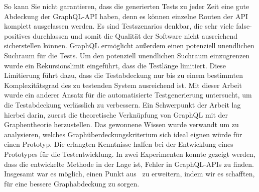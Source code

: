 So kann Sie nicht garantieren, dass die generierten Tests zu jeder Zeit eine gute Abdeckung der GraphQL-API haben, denn es können einzelne Routen der API
komplett ausgelassen werden.
Es sind Testszenarios denkbar, die sehr viele false-positives durchlassen und somit die Qualität der Software nicht ausreichend sicherstellen können.
GraphQL ermöglicht außerdem einen potenziell unendlichen Suchraum für die Tests.
Um den potenziell unendlichen Suchraum einzugrenzen wurde ein Rekursionslimit eingeführt, dass die Testlänge limitiert.
Diese Limitierung führt dazu, dass die Testabdeckung nur bis zu einem bestimmten Komplexitätsgrad des zu testenden System ausreichend ist.
Mit dieser Arbeit wurde ein anderer Ansatz für die automatisierte Testgenerierung untersucht, um die Testabdeckung verlässlich zu verbessern.
Ein Schwerpunkt der Arbeit lag hierbei darin, zuerst die theoretische Verknüpfung von GraphQL mit der Graphentheorie herzustellen.
Das gewonnene Wissen wurde verwandt um zu analysieren, welches Graphüberdeckungskriterium sich ideal eignen würde für einen Prototyp.
Die erlangten Kenntnisse halfen bei der Entwicklung eines Prototypes für die Testentwicklung.
In zwei Experimenten konnte gezeigt werden, dass die entwickelte Methode in der Lage ist, Fehler in GraphQL-APIs zu finden.
Insgesamt war es möglich, einen Punkt aus~\cite[VI. Future Work]{property-based-testing} zu erweitern, indem wir es schafften,
für eine bessere Graphabdeckung zu sorgen.









